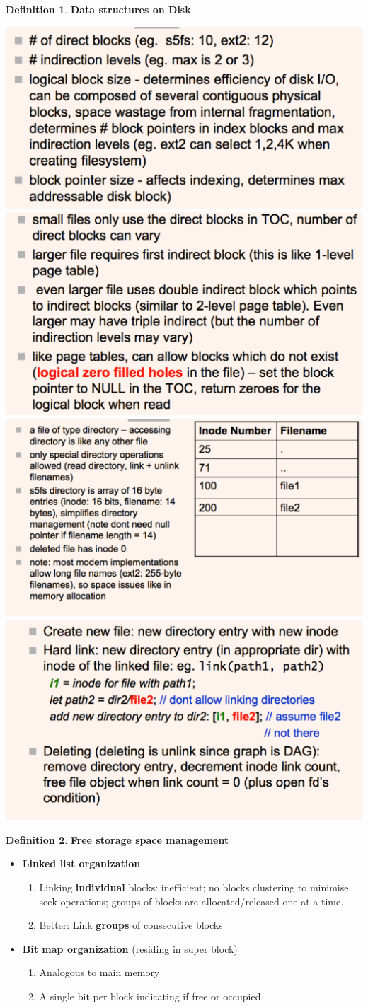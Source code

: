\documentclass[11pt,a4paper]{article}
\theoremstyle{definition}
\newtheorem{definition}{Definition}[section]
\newenvironment{myitemize}
{ \begin{itemize}
    \setlength{\itemsep}{5pt}
    \setlength{\parskip}{0pt}
    \setlength{\parsep}{0pt}     }
{ \end{itemize}                  }
\newenvironment{myenumerate}
{ \begin{enumerate}
    \setlength{\itemsep}{5pt}
    \setlength{\parskip}{0pt}
    \setlength{\parsep}{0pt}     }
{ \end{enumerate}                }
\begin{document}
\begin{definition}{\textbf{Data structures on Disk}}
\begin{myitemize}
\begin{myenumerate}
			\includegraphics[width=0.50\linewidth]{m2/systemVFileSystem5}
			\includegraphics[width=0.50\linewidth]{m2/systemVFileSystem6}
			\includegraphics[width=0.50\linewidth]{m2/systemVFileSystem7}
			\includegraphics[width=0.50\linewidth]{m2/systemVFileSystem8}
		\end{myenumerate}
	\end{myitemize}
\end{definition}

\begin{definition}{\textbf{Free storage space management}}
	\begin{myitemize}
		\item \textbf{Linked list organization}
		\begin{myenumerate}
			\item Linking \textbf{individual} blocks: inefficient; no blocks clustering to minimise seek operations; groups of blocks are allocated/released one at a time.
			\item Better: Link \textbf{groups} of consecutive blocks
		\end{myenumerate}
		\item \textbf{Bit map organization} (residing in super block)
		\begin{myenumerate}
			\item Analogous to main memory
			\item A single bit per block indicating if free or occupied
		\end{myenumerate}
	\end{myitemize}
\end{definition}
\end{document}
